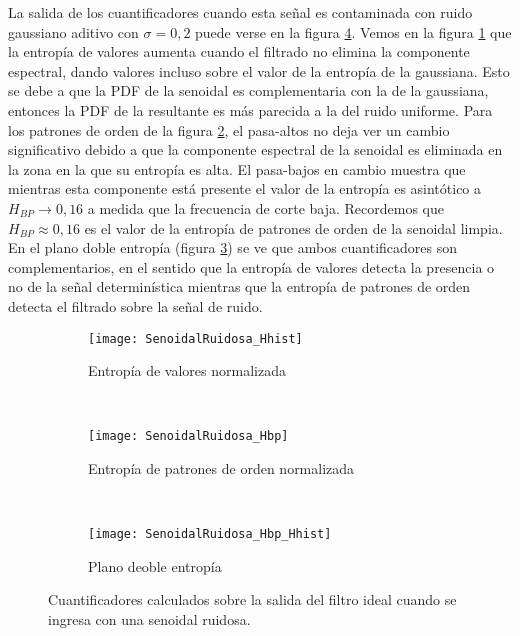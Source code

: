 La salida de los cuantificadores cuando esta señal es contaminada con ruido gaussiano aditivo con $\sigma=0,2$ puede verse en la figura \ref{fig:SenoidalRuidosa}. Vemos en la figura \ref{subfig:SenoidalRuidosa_Hhist} que la entropía de valores aumenta cuando el filtrado no elimina la componente espectral, dando valores incluso sobre el valor de la entropía de la gaussiana. Esto se debe a que la PDF de la senoidal es complementaria con la de la gaussiana, entonces la PDF de la resultante es más parecida a la del ruido uniforme.
Para los patrones de orden de la figura \ref{subfig:SenoidalRuidosa_Hbp}, el pasa-altos no deja ver un cambio significativo debido a que la componente espectral de la senoidal es eliminada en la zona en la que su entropía es alta.
El pasa-bajos en cambio muestra que mientras esta componente está presente el valor de la entropía es asintótico a $H_{BP}\to0,16$ a medida que la frecuencia de corte baja. Recordemos que $H_{BP}\approx0,16$ es el valor de la entropía de patrones de orden de la senoidal limpia.
En el plano doble entropía (figura \ref{subfig:SenoidalRuidosa_HbpHhist}) se ve que ambos cuantificadores son complementarios, en el sentido que la entropía de valores detecta la presencia o no de la señal determinística mientras que la entropía de patrones de orden detecta el filtrado sobre la señal de ruido.
%
\begin{figure}[h]
    \centering
    \begin{subfigure}[t]{0.32\textwidth}
        \texttt{[image: SenoidalRuidosa\_Hhist]}
        \caption{Entropía de valores normalizada}
        \label{subfig:SenoidalRuidosa_Hhist}
    \end{subfigure}
    ~ %
    \begin{subfigure}[t]{0.32\textwidth}
        \texttt{[image: SenoidalRuidosa\_Hbp]}
        \caption{Entropía de patrones de orden normalizada}
        \label{subfig:SenoidalRuidosa_Hbp}
    \end{subfigure}
    ~ %
    \begin{subfigure}[t]{0.32\textwidth}
        \texttt{[image: SenoidalRuidosa\_Hbp\_Hhist]}
        \caption{Plano deoble entropía}
        \label{subfig:SenoidalRuidosa_HbpHhist}
    \end{subfigure}
    \caption{Cuantificadores calculados sobre la salida del filtro ideal cuando se ingresa con una senoidal ruidosa.}\label{fig:SenoidalRuidosa}
\end{figure}

